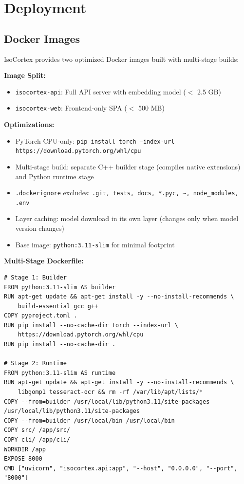 \documentclass[11pt,a4paper]{article}
\newcommand{\inlinecode}[1]{\texttt{\small\colorbox{ctCodeBg}{#1}}}
\begin{document}
\section{Deployment}

\subsection{Docker Images}

IsoCortex provides two optimized Docker images built with multi-stage builds:

\begin{reqbox}
\textbf{Image Split:}
\begin{itemize}
    \item \inlinecode{isocortex-api}: Full API server with embedding model ($<$ 2.5 GB)
    \item \inlinecode{isocortex-web}: Frontend-only SPA ($<$ 500 MB)
\end{itemize}

\textbf{Optimizations:}
\begin{itemize}
    \item PyTorch CPU-only: \inlinecode{pip install torch --index-url https://download.pytorch.org/whl/cpu}
    \item Multi-stage build: separate C++ builder stage (compiles native extensions) and Python runtime stage
    \item \inlinecode{.dockerignore} excludes: \inlinecode{.git, tests, docs, *.pyc, \textasciitilde{}, node\_modules, .env}
    \item Layer caching: model download in its own layer (changes only when model version changes)
    \item Base image: \inlinecode{python:3.11-slim} for minimal footprint
\end{itemize}

\textbf{Multi-Stage Dockerfile:}
\end{reqbox}

\begin{lstlisting}[language={},title={Dockerfile (Simplified)}]
# Stage 1: Builder
FROM python:3.11-slim AS builder
RUN apt-get update && apt-get install -y --no-install-recommends \
    build-essential gcc g++
COPY pyproject.toml .
RUN pip install --no-cache-dir torch --index-url \
    https://download.pytorch.org/whl/cpu
RUN pip install --no-cache-dir .

# Stage 2: Runtime
FROM python:3.11-slim AS runtime
RUN apt-get update && apt-get install -y --no-install-recommends \
    libgomp1 tesseract-ocr && rm -rf /var/lib/apt/lists/*
COPY --from=builder /usr/local/lib/python3.11/site-packages /usr/local/lib/python3.11/site-packages
COPY --from=builder /usr/local/bin /usr/local/bin
COPY src/ /app/src/
COPY cli/ /app/cli/
WORKDIR /app
EXPOSE 8000
CMD ["uvicorn", "isocortex.api:app", "--host", "0.0.0.0", "--port", "8000"]
\end{lstlisting}
\end{document}
